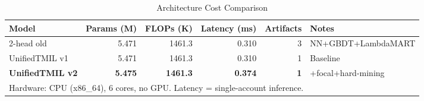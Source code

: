 \begin{table}[t]
\centering
\caption{Architecture Cost Comparison}
\label{tab:arch_cost}
\begin{tabular}{lrrrrl}
\hline
Model & Params (M) & FLOPs (K) & Latency (ms) & Artifacts & Notes \\
\hline
2-head old & 5.471 & 1461.3 & 0.310 & 3 & NN+GBDT+LambdaMART \\
UnifiedTMIL v1 & 5.471 & 1461.3 & 0.310 & 1 & Baseline \\
\textbf{UnifiedTMIL v2} & \textbf{5.475} & \textbf{1461.3} & \textbf{0.374} & \textbf{1} & +focal+hard-mining \\
\hline
\multicolumn{6}{l}{\small Hardware: CPU (x86\_64), 6 cores, no GPU. Latency = single-account inference.} \\
\end{tabular}
\end{table}
